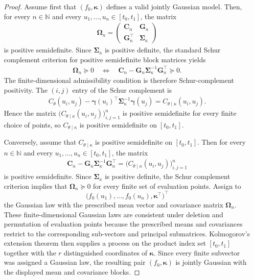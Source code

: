 \documentclass[11pt,a4paper]{article}
\theoremstyle{definition}
\theoremstyle{remark}
\begin{document}
\begin{proof}
Assume first that $(f_0,\boldsymbol{\kappa})$ defines a valid jointly Gaussian model. Then, for every $n\in\mathbb{N}$ and every $u_1,\ldots,u_n\in[t_0,t_1]$, the matrix
\begin{align*}
\boldsymbol{\Omega}_n=
\begin{pmatrix}
\mathbf{C}_n & \mathbf{G}_n\\
\mathbf{G}_n^\top & \boldsymbol{\Sigma}_{\kappa}
\end{pmatrix}
\end{align*}
is positive semidefinite. Since $\boldsymbol{\Sigma}_{\kappa}$ is positive definite, the standard Schur complement criterion for positive semidefinite block matrices yields
\begin{align*}
\boldsymbol{\Omega}_n\succeq 0
\quad\Longleftrightarrow\quad
\mathbf{C}_n-\mathbf{G}_n\boldsymbol{\Sigma}_{\kappa}^{-1}\mathbf{G}_n^\top\succeq 0.
\end{align*}
The finite-dimensional admissibility condition is therefore Schur-complement positivity.
The $(i,j)$ entry of the Schur complement is
\begin{align*}
C_\theta(u_i,u_j)-\boldsymbol{\gamma}(u_i)^\top\boldsymbol{\Sigma}_{\kappa}^{-1}\boldsymbol{\gamma}(u_j)
=
C_{\theta\mid\kappa}(u_i,u_j).
\end{align*}
Hence the matrix $\bigl(C_{\theta\mid\kappa}(u_i,u_j)\bigr)_{i,j=1}^n$ is positive semidefinite for every finite choice of points, so $C_{\theta\mid\kappa}$ is positive semidefinite on $[t_0,t_1]$.

Conversely, assume that $C_{\theta\mid\kappa}$ is positive semidefinite on $[t_0,t_1]$. Then for every $n\in\mathbb{N}$ and every $u_1,\ldots,u_n\in[t_0,t_1]$, the matrix
\begin{align*}
\mathbf{C}_n-\mathbf{G}_n\boldsymbol{\Sigma}_{\kappa}^{-1}\mathbf{G}_n^\top
=
\bigl(C_{\theta\mid\kappa}(u_i,u_j)\bigr)_{i,j=1}^n
\end{align*}
is positive semidefinite. Since $\boldsymbol{\Sigma}_{\kappa}$ is positive definite, the Schur complement criterion implies that $\boldsymbol{\Omega}_n\succeq 0$ for every finite set of evaluation points. Assign to
\[
\bigl(f_0(u_1),\ldots,f_0(u_n),\boldsymbol{\kappa}^\top\bigr)^\top
\]
the Gaussian law with the prescribed mean vector and covariance matrix $\boldsymbol{\Omega}_n$. These finite-dimensional Gaussian laws are consistent under deletion and permutation of evaluation points because the prescribed means and covariances restrict to the corresponding sub-vectors and principal submatrices. Kolmogorov's extension theorem then supplies a process on the product index set \([t_0,t_1]\) together with the \(r\) distinguished coordinates of \(\boldsymbol{\kappa}\). Since every finite subvector was assigned a Gaussian law, the resulting pair \((f_0,\boldsymbol{\kappa})\) is jointly Gaussian with the displayed mean and covariance blocks.
\end{proof}
\end{document}
